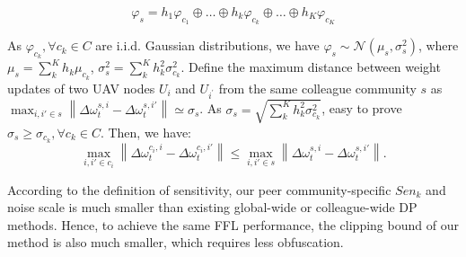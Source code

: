 \documentclass[lettersize,journal]{IEEEtran}
\begin{document}
\begin{equation}    \varphi_{s}=h_{1}\varphi_{c_{1}}\oplus\ldots\oplus h_{k}\varphi_{c_{k}}\oplus\ldots\oplus h_{K}\varphi_{c_{K}}
\end{equation}


As $\varphi_{c_{k}}, \forall c_{k} \in C$ are i.i.d. Gaussian distributions, we have $\varphi_{s} \sim \mathcal{N}\left(\mu_{s}, \sigma_{s}^{2}\right)$, where $\mu_{s}=\sum_{k}^{K} h_{k} \mu_{c_{k}}$, $\sigma_{s}^{2}=\sum_{k}^{K} h_{k}^{2} \sigma_{c_k}^{2}$. 
Define the maximum distance between weight updates of two UAV nodes $U_i$ and $U_{i^{\prime}}$ from the same colleague community $s$ as $\max_{i,i'\in s} \left\| \Delta\omega_{t}^{s,i}-\Delta\omega_{t}^{s,i'}\right\| \simeq \sigma_{s}$. As $\sigma_{s}=\sqrt{\sum_{k}^{K} h_{k}^{2} \sigma_{c_k}^{2}}$, easy to prove $\sigma_{s}\geq\sigma_{c_{k}}, \forall c_k \in C$.
Then, we have:
\begin{equation}
    \max_{i,i'\in c_{i}} \left\| \Delta\omega_{t}^{c_{i},i}-\Delta\omega_{t}^{c_{i},i'}\right\|\leq \max_{i,i'\in s} \left\| \Delta\omega_{t}^{s,i}-\Delta\omega_{t}^{s,i'}\right\|.
\end{equation}

According to the definition of sensitivity, our peer community-specific $Sen_k$ and noise scale is much smaller than existing global-wide or colleague-wide DP methods. Hence, to achieve the same FFL performance, the clipping bound of our method is also much smaller, which requires less obfuscation. 
\end{document}
